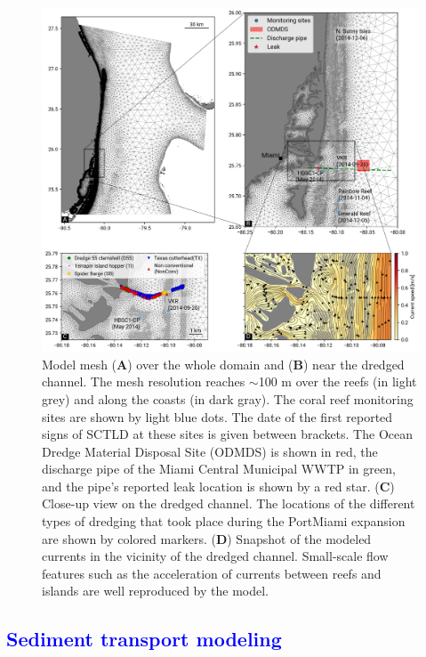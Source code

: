 \documentclass[preprint,12pt,authoryear]{elsarticle}
\newcommand{\modif}[1]{\textcolor{blue}{#1}}
\begin{document}
\begin{figure}
	\centering
	\includegraphics[width=\textwidth]{figures/fig_mesh_new.png}
    \caption{Model mesh (\textbf{A}) over the whole domain and (\textbf{B}) near the dredged channel. The mesh resolution reaches $\sim$100 m over the reefs (in light grey) and along the coasts (in dark gray). The coral reef monitoring sites are shown by light blue dots. The date of the first reported signs of SCTLD at these sites is given between brackets. The Ocean Dredge Material Disposal Site (ODMDS) is shown in red, the discharge pipe of the Miami Central Municipal WWTP in green, and the pipe's reported leak location is shown by a red star. (\textbf{C}) Close-up view on the dredged channel. The locations of the different types of dredging that took place during the PortMiami expansion are shown by colored markers. (\textbf{D}) Snapshot of the modeled currents in the vicinity of the dredged channel. Small-scale flow features such as the acceleration of currents between reefs and islands are well reproduced by the model.}
	\label{fig:onset_mesh}
\end{figure}

\modif{\subsection{Sediment transport modeling}}
\end{document}
